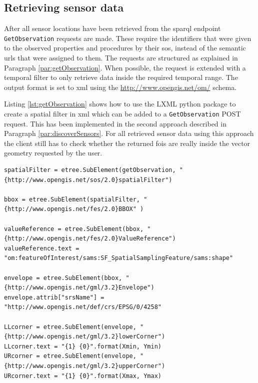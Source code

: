 \subsection{Retrieving sensor data}
After all sensor locations have been retrieved from the \ac{sparql} endpoint \texttt{GetObservation} requests are made. These require the identifiers that were given to the observed properties and procedures by their \ac{sos}, instead of the semantic \acp{url} that were assigned to them. The requests are structured as explained in Paragraph \ref{par:getObservation}. When possible, the request is extended with a temporal filter to only retrieve data inside the required temporal range. The output format is set to \ac{xml} using the \url{http://www.opengis.net/om/} schema.

Listing \ref{lst:getObservation} shows how to use the LXML python package to create a spatial filter in \ac{xml} which can be added to a \texttt{GetObservation} POST request. This has been implemented in the second approach described in Paragraph \ref{par:discoverSensors}. For all retrieved sensor data using this approach the client still has to check whether the returned \acp{foi} are really inside the vector geometry requested by the user. 

\begin{lstlisting}[float,caption={Script that creates an LXML graph object called spatialFilter to add to a \texttt{GetObservaton} POST request}, label={lst:getObservation}]
spatialFilter = etree.SubElement(getObservation, "{http://www.opengis.net/sos/2.0}spatialFilter")

bbox = etree.SubElement(spatialFilter, "{http://www.opengis.net/fes/2.0}BBOX" )

valueReference = etree.SubElement(bbox, "{http://www.opengis.net/fes/2.0}ValueReference")
valueReference.text = "om:featureOfInterest/sams:SF_SpatialSamplingFeature/sams:shape"

envelope = etree.SubElement(bbox, "{http://www.opengis.net/gml/3.2}Envelope")
envelope.attrib["srsName"] = "http://www.opengis.net/def/crs/EPSG/0/4258"

LLcorner = etree.SubElement(envelope, "{http://www.opengis.net/gml/3.2}lowerCorner")
LLcorner.text = "{1} {0}".format(Xmin, Ymin)
URcorner = etree.SubElement(envelope, "{http://www.opengis.net/gml/3.2}upperCorner")
URcorner.text = "{1} {0}".format(Xmax, Ymax)
\end{lstlisting}

